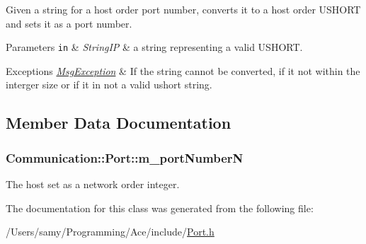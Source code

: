Given a string for a host order port number, converts it to a host order U\+S\+H\+O\+R\+T and sets it as a port number. 


\begin{DoxyParams}[1]{Parameters}
\mbox{\tt in}  & {\em String\+I\+P} & a string representing a valid U\+S\+H\+O\+R\+T.\\
\hline
\end{DoxyParams}

\begin{DoxyExceptions}{Exceptions}
{\em \hyperlink{class_communication_1_1_msg_exception}{Msg\+Exception}} & If the string cannot be converted, if it not within the interger size or if it in not a valid ushort string. \\
\hline
\end{DoxyExceptions}


\subsection{Member Data Documentation}
\hypertarget{class_communication_1_1_port_a925dfe7c4be16434b5838ba649f1c30f}{}
\subsubsection[{m\+\_\+port\+Number\+N}]{ Communication\+::\+Port\+::m\+\_\+port\+Number\+N\hspace{0.3cm}{\ttfamily [private]}}\label{class_communication_1_1_port_a925dfe7c4be16434b5838ba649f1c30f}


The host set as a network order integer. 



The documentation for this class was generated from the following file\+:\begin{DoxyCompactItemize}
\item 
/\+Users/samy/\+Programming/\+Ace/include/\hyperlink{_port_8h}{Port.\+h}\end{DoxyCompactItemize}
